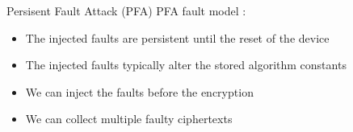 \documentclass[table,aspectratio=169]{beamer}
\begin{document}
\begin{frame}{Persisent Fault Attack (PFA)}
PFA fault model \cite{tches_0010L0BHDQR18}:
\begin{itemize}
\item<1-> The injected faults are persistent until the reset of the device
\item<2-> The injected faults typically alter the stored algorithm constants
\item<3-> We can inject the faults before the encryption
\item<4-> We can collect multiple faulty ciphertexts
\end{itemize}
\end{frame}
\end{document}
